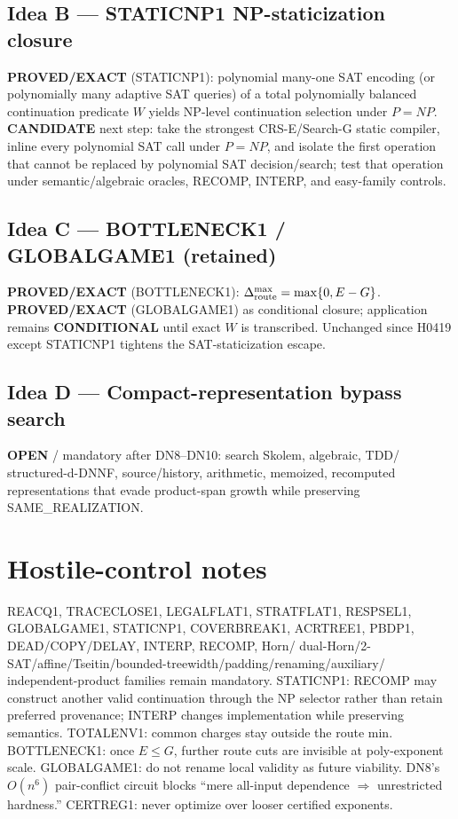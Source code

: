 \documentclass[11pt]{article}
\begin{document}
\subsection*{Idea B --- STATICNP1 NP-staticization closure}
\textbf{PROVED/EXACT} (STATICNP1): polynomial many-one SAT encoding (or
polynomially many adaptive SAT queries) of a total polynomially balanced
continuation predicate $W$ yields NP-level continuation selection under $P=NP$.
\textbf{CANDIDATE} next step: take the strongest CRS-E/Search-G static compiler,
inline every polynomial SAT call under $P=NP$, and isolate the first operation
that cannot be replaced by polynomial SAT decision/search; test that operation
under semantic/algebraic oracles, RECOMP, INTERP, and easy-family controls.

\subsection*{Idea C --- BOTTLENECK1 / GLOBALGAME1 (retained)}
\textbf{PROVED/EXACT} (BOTTLENECK1): $\Delta_{\rm route}^{\max}=\max\{0,E-G\}$.
\textbf{PROVED/EXACT} (GLOBALGAME1) as conditional closure; application remains
\textbf{CONDITIONAL} until exact $W$ is transcribed. Unchanged since H0419 except
STATICNP1 tightens the SAT-staticization escape.

\subsection*{Idea D --- Compact-representation bypass search}
\textbf{OPEN} / mandatory after DN8--DN10: search Skolem, algebraic, TDD/
structured-d-DNNF, source/history, arithmetic, memoized, recomputed
representations that evade product-span growth while preserving
SAME\_REALIZATION.

\section*{Hostile-control notes}
REACQ1, TRACECLOSE1, LEGALFLAT1, STRATFLAT1, RESPSEL1, GLOBALGAME1, STATICNP1,
COVERBREAK1, ACRTREE1, PBDP1, DEAD/COPY/DELAY, INTERP, RECOMP, Horn/
dual-Horn/2-SAT/affine/Tseitin/bounded-treewidth/padding/renaming/auxiliary/
independent-product families remain mandatory. STATICNP1: RECOMP may construct
another valid continuation through the NP selector rather than retain preferred
provenance; INTERP changes implementation while preserving semantics.
TOTALENV1: common charges stay outside the route min. BOTTLENECK1: once $E\le G$,
further route cuts are invisible at poly-exponent scale. GLOBALGAME1: do not
rename local validity as future viability. DN8's $O(n^6)$ pair-conflict circuit
blocks ``mere all-input dependence $\Rightarrow$ unrestricted hardness.''
CERTREG1: never optimize over looser certified exponents.
\end{document}
